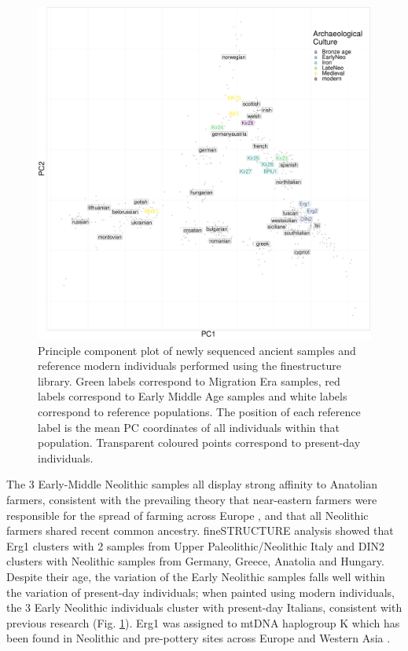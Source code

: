 \begin{figure}[htp]
    \centering
    \includegraphics[width=1.0\textwidth]{../images/chapter4/chunklengths_moderns_ancients_PCA.pdf}
    \caption{Principle component plot of newly sequenced ancient samples and reference modern individuals performed using the finestructure library. Green labels correspond to Migration Era samples, red labels correspond to Early Middle Age samples and white labels correspond to reference populations. The position of each reference label is the mean PC coordinates of all individuals within that population. Transparent coloured points correspond to present-day individuals.}
    \label{fig:chunklengths_moderns_ancients_PCA}
\end{figure}

The 3 Early-Middle Neolithic samples all display strong affinity to Anatolian farmers, consistent with the prevailing theory that near-eastern farmers were responsible for the spread of farming across Europe \cite{Haak2010, haak2005ancient, bramanti2009genetic, Lazaridis2014}, and that all Neolithic farmers shared recent common ancestry. fineSTRUCTURE analysis showed that Erg1 clusters with 2 samples from Upper Paleolithic/Neolithic Italy and DIN2 clusters with Neolithic samples from Germany, Greece, Anatolia and Hungary. Despite their age, the variation of the Early Neolithic samples falls well within the variation of present-day individuals; when painted using modern individuals, the 3 Early Neolithic individuals cluster with present-day Italians, consistent with previous research \cite{Lazaridis2014, Haak2015} (Fig. \ref{fig:chunklengths_moderns_ancients_PCA}). Erg1 was assigned to mtDNA haplogroup K which has been found in Neolithic and pre-pottery sites across Europe \cite{Hofmanova2016, fernandez2014ancient} and Western Asia \cite{Lazaridis2016, Mathieson2015}. 

